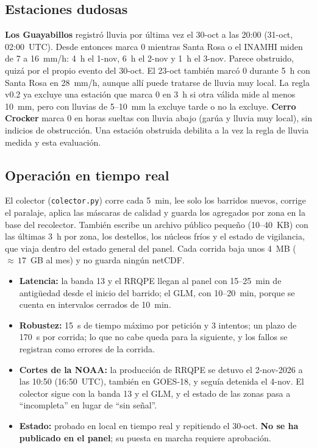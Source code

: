 \documentclass{sosg-informe}
\begin{document}
\subsection{Estaciones dudosas}\label{sec:dudosas}
\textbf{Los Guayabillos} registró lluvia por última vez el 30-oct a las 20:00 (31-oct, 02:00~UTC). Desde entonces marca 0 mientras Santa Rosa o el INAMHI miden de 7 a 16~mm/h: 4~h el 1-nov, 6~h el 2-nov y 1~h el 3-nov. Parece obstruido, quizá por el propio evento del 30-oct. El 23-oct también marcó 0 durante 5~h con Santa Rosa en 28~mm/h, aunque allí puede tratarse de lluvia muy local. La regla v0.2 ya excluye una estación que marca 0 en 3~h si otra válida mide al menos 10~mm, pero con lluvias de 5--10~mm la excluye tarde o no la excluye. \textbf{Cerro Crocker} marca 0 en horas sueltas con lluvia abajo (garúa y lluvia muy local), sin indicios de obstrucción. Una estación obstruida debilita a la vez la regla de lluvia medida y esta evaluación.

\subsection{Operación en tiempo real}
El colector (\texttt{colector.py}) corre cada 5~min, lee solo los barridos nuevos, corrige el paralaje, aplica las máscaras de calidad y guarda los agregados por zona en la base del recolector. También escribe un archivo público pequeño (10--40~KB) con las últimas 3~h por zona, los destellos, los núcleos fríos y el estado de vigilancia, que viaja dentro del estado general del panel. Cada corrida baja unos 4~MB (${\approx}\,17$~GB al mes) y no guarda ningún netCDF.
\begin{itemize}
  \item \textbf{Latencia:} la banda 13 y el RRQPE llegan al panel con 15--25~min de antigüedad desde el inicio del barrido; el GLM, con 10--20~min, porque se cuenta en intervalos cerrados de 10~min.
  \item \textbf{Robustez:} 15~s de tiempo máximo por petición y 3 intentos; un plazo de 170~s por corrida; lo que no cabe queda para la siguiente, y los fallos se registran como errores de la corrida.
  \item \textbf{Cortes de la NOAA:} la producción de RRQPE se detuvo el 2-nov-2026 a las 10:50 (16:50~UTC), también en GOES-18, y seguía detenida el 4-nov. El colector sigue con la banda 13 y el GLM, y el estado de las zonas pasa a \enquote{incompleta} en lugar de \enquote{sin señal}.
  \item \textbf{Estado:} probado en local en tiempo real y repitiendo el 30-oct. \textbf{No se ha publicado en el panel}; su puesta en marcha requiere aprobación.
\end{itemize}
\end{document}
